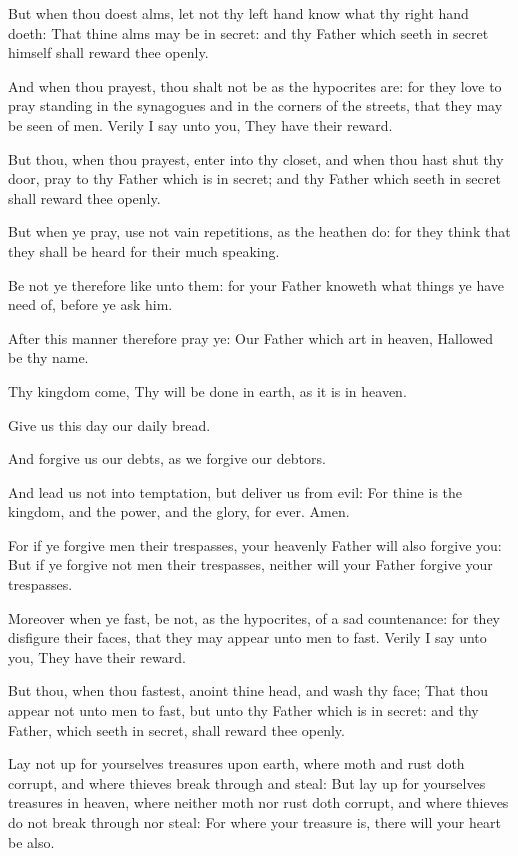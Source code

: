 \Verse But when thou doest alms, let not thy left hand know what thy right hand doeth: \Verse That thine alms may be in secret: and thy Father which seeth in secret himself shall reward thee openly.

\Verse And when thou prayest, thou shalt not be as the hypocrites are: for they love to pray standing in the synagogues and in the corners of the streets, that they may be seen of men. Verily I say unto you, They have their reward.

\Verse But thou, when thou prayest, enter into thy closet, and when thou hast shut thy door, pray to thy Father which is in secret; and thy Father which seeth in secret shall reward thee openly.

\Verse But when ye pray, use not vain repetitions, as the heathen do: for they think that they shall be heard for their much speaking.

\Verse Be not ye therefore like unto them: for your Father knoweth what things ye have need of, before ye ask him.

\Verse After this manner therefore pray ye: Our Father which art in heaven, Hallowed be thy name.

\Verse Thy kingdom come, Thy will be done in earth, as it is in heaven.

\Verse Give us this day our daily bread.

\Verse And forgive us our debts, as we forgive our debtors.

\Verse And lead us not into temptation, but deliver us from evil: For thine is the kingdom, and the power, and the glory, for ever. Amen.

\Verse For if ye forgive men their trespasses, your heavenly Father will also forgive you: \Verse But if ye forgive not men their trespasses, neither will your Father forgive your trespasses.

\Verse Moreover when ye fast, be not, as the hypocrites, of a sad countenance: for they disfigure their faces, that they may appear unto men to fast. Verily I say unto you, They have their reward.

\Verse But thou, when thou fastest, anoint thine head, and wash thy face; \Verse That thou appear not unto men to fast, but unto thy Father which is in secret: and thy Father, which seeth in secret, shall reward thee openly.

\Verse Lay not up for yourselves treasures upon earth, where moth and rust doth corrupt, and where thieves break through and steal: \Verse But lay up for yourselves treasures in heaven, where neither moth nor rust doth corrupt, and where thieves do not break through nor steal: \Verse For where your treasure is, there will your heart be also.


